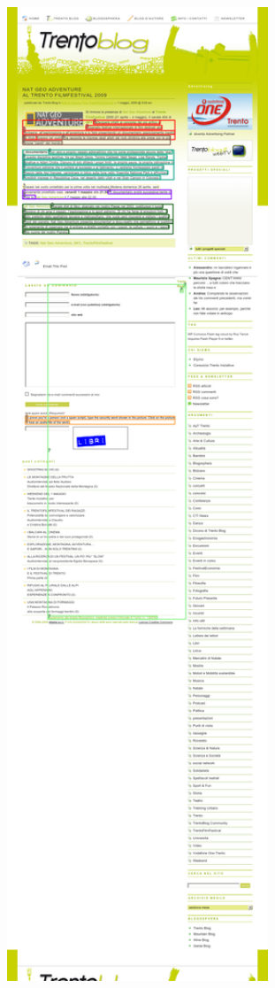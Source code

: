 \documentclass{beamer}
\begin{document}
        \begin{frame}
            \frametitle{}
            \begin{center}
                \includegraphics[width=0.8\textwidth]{1125_pred.png}
            \end{center}
        \end{frame}
\end{document}
